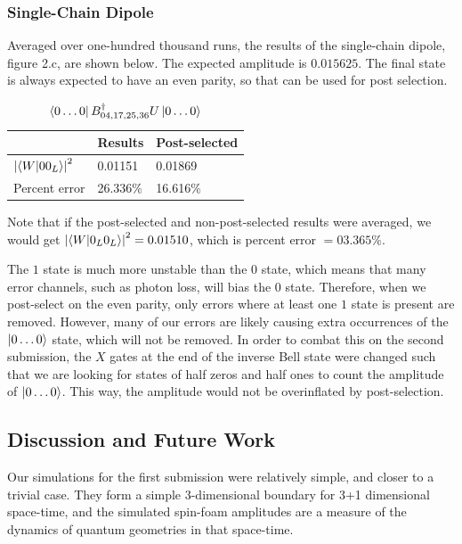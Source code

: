 \documentclass[a4paper,11pt,aps,tightenlines,nofootinbib]{revtex4}
\begin{document}
        \subsubsection{Single-Chain Dipole}
        Averaged over one-hundred thousand runs, the results of the single-chain dipole, figure 2.c, are shown below. 
        The expected amplitude is $0.015625$. The final state is always expected to have an even parity, so that can be used for post selection.
        \begin{table}[h]
        \begin{centering}
                \begin{tabular}{|l|l|l|}
                        \hline
                         & Results & Post-selected\\ \hline
                        $\abs{\bra{W}\ket{00_L}}^2$ & 0.01151 & 0.01869\\ \hline
                        Percent error &  26.336\%& 16.616\% \\\hline
                \end{tabular}
                \caption{$\bra{0\dots0}B^\dagger_{04,17,25,36}U\ket{0\dots 0}$}
        \end{centering}
        \end{table}

        Note that if the post-selected and non-post-selected results were averaged, we 
        would get $\abs{\bra{W}\ket{0_L0_L}}^2=0.01510$, which is percent error $=03.365\%$. 

        The $1$ state is much more unstable than the $0$ state, which means that many error channels,
         such as photon loss, will bias the $0$ state\cite{photon-loss}. Therefore, when we post-select 
        on the even parity, only errors where at least one  $1$ state is present are removed. However, many 
        of our errors are likely causing extra occurrences of the $\ket{0\dots0}$ state, which will not be removed.
        In order to combat this on the second submission, the $X$ gates at the end of the inverse Bell state were 
        changed such that we are looking for states of half zeros and half ones to count the amplitude of 
        $\ket{0\dots0}$. This way, the amplitude would not be overinflated by post-selection.

\subsection{Discussion and Future Work}
        Our simulations for the first submission were relatively simple, and closer to a trivial case. They  
        form a simple 3-dimensional boundary for 3+1 dimensional space-time, and the simulated spin-foam amplitudes are 
        a measure of the dynamics of quantum geometries in that space-time.
\end{document}
